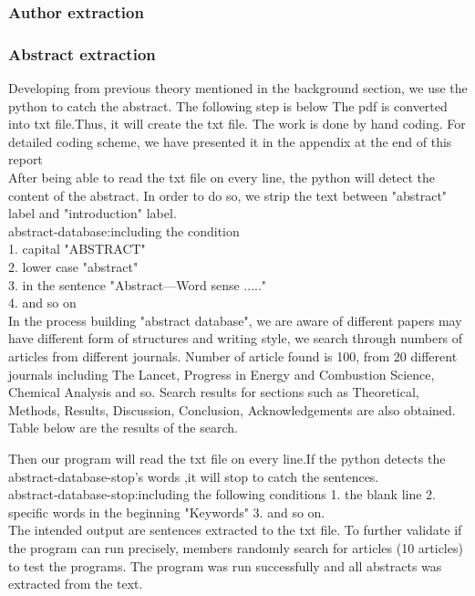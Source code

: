 \subsubsection*{Author extraction}


\subsubsection*{Abstract extraction}
	Developing from previous theory mentioned in the background section, we use the python to catch the abstract. The following step is below
	The pdf is converted into txt file.Thus, it will create the txt file. The work is done by hand coding. For detailed coding scheme, we have presented it in the appendix at the end of this report\\ 
	After being able to read the txt file on every line, the python will detect the content of the abstract. In order to do so, we strip the text between "abstract" label and "introduction" label.\\ 	
	abstract-database:including the condition\\
	1. capital         "ABSTRACT"\\
	2. lower case      "abstract"\\
	3. in the sentence "Abstract—Word sense ....."\\
	4. and so on \\
	In the process building "abstract database", we are aware of different papers may have different form of structures and writing style, we search through numbers of articles from different journals. Number of article found is 100, from 20 different journals including The Lancet, Progress in Energy and Combustion Science, Chemical Analysis and so. Search results for sections such as Theoretical, Methods, Results, Discussion, Conclusion, Acknowledgements are also obtained.  Table below are the results of the search.\\
	\begin{center}
	\end{center}
	Then our program will read the txt file on every line.If the python detects the abstract-database-stop's words ,it will stop to catch the sentences.\\ 
	abstract-database-stop:including the following conditions
	1. the blank line
	2. specific words in the beginning "Keywords"
	3. and so on.\\
	The intended output are sentences extracted to the txt file. To further validate if the program can run precisely, members randomly search for articles (10 articles) to test the programs. The program was run successfully and all abstracts was extracted from the text. \\ 	
	

